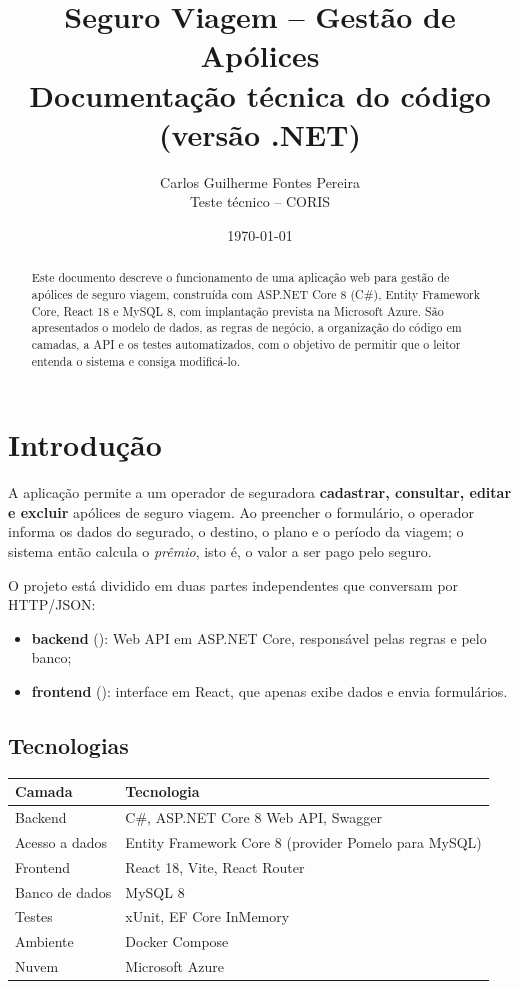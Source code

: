 \documentclass[11pt,a4paper]{article}
\title{Seguro Viagem -- Gestão de Apólices\\[0.3em]
  \large Documentação técnica do código (versão .NET)}
\author{Carlos Guilherme Fontes Pereira\\ \small Teste técnico -- CORIS}
\date{\today}
\newcommand{\arq}[1]{\texttt{\detokenize{#1}}}
\begin{document}
\maketitle

\begin{abstract}
Este documento descreve o funcionamento de uma aplicação web para gestão de apólices de seguro
viagem, construída com ASP.NET Core 8 (C\#), Entity Framework Core, React 18 e MySQL 8, com
implantação prevista na Microsoft Azure. São apresentados o modelo de dados, as regras de negócio,
a organização do código em camadas, a API e os testes automatizados, com o objetivo de permitir que
o leitor entenda o sistema e consiga modificá-lo.
\end{abstract}

\tableofcontents
\newpage

\section{Introdução}

A aplicação permite a um operador de seguradora \textbf{cadastrar, consultar, editar e excluir}
apólices de seguro viagem. Ao preencher o formulário, o operador informa os dados do segurado,
o destino, o plano e o período da viagem; o sistema então calcula o \emph{prêmio}, isto é, o
valor a ser pago pelo seguro.

O projeto está dividido em duas partes independentes que conversam por HTTP/JSON:

\begin{itemize}
  \item \textbf{backend} (\arq{backend/}): Web API em ASP.NET Core, responsável pelas regras e pelo banco;
  \item \textbf{frontend} (\arq{frontend/}): interface em React, que apenas exibe dados e envia formulários.
\end{itemize}

\subsection{Tecnologias}

\begin{center}
\begin{tabular}{@{}ll@{}}
\toprule
Camada & Tecnologia \\
\midrule
Backend & C\#, ASP.NET Core 8 Web API, Swagger \\
Acesso a dados & Entity Framework Core 8 (provider Pomelo para MySQL) \\
Frontend & React 18, Vite, React Router \\
Banco de dados & MySQL 8 \\
Testes & xUnit, EF Core InMemory \\
Ambiente & Docker Compose \\
Nuvem & Microsoft Azure \\
\bottomrule
\end{tabular}
\end{center}
\end{document}
